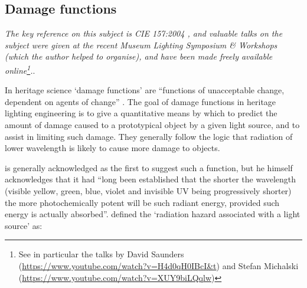 
\subsection{Damage functions} \label{sec:DamageIndex}


\textit{The key reference on this subject is \gls{CIE} 157:2004 \citep{cie_cie_2004}, and valuable talks on the subject were given at the recent Museum Lighting Symposium \& Workshops \citep{pokorska_book_2017} (which the author helped to organise), and have been made freely available online\footnote{See in particular the talks by David Saunders (\url{https://www.youtube.com/watch?v=H4d0qH0IBcI&t}) and Stefan Michalski (\url{https://www.youtube.com/watch?v=XUY9biLQqlw})}.}.

\bigskip

In heritage science `damage functions' are ``functions of unacceptable change, dependent on agents of change'' \citep{strlic_damage_2013}. The goal of damage functions in heritage lighting engineering is to give a quantitative means by which to predict the amount of damage caused to a prototypical object by a given light source, and to assist in limiting such damage. They generally follow the logic that radiation of lower wavelength is likely to cause more damage to objects.

\citet{harrison_report_1953} is generally acknowledged as the first to suggest such a function, but he himself acknowledges that it had ``long been established that the shorter the wavelength (visible yellow, green, blue, violet and invisible UV being progressively shorter) the more photochemically potent will be such radiant energy, provided such energy is actually absorbed''. \citet[p.9]{harrison_report_1953} defined the `radiation hazard associated with a light source' as:

